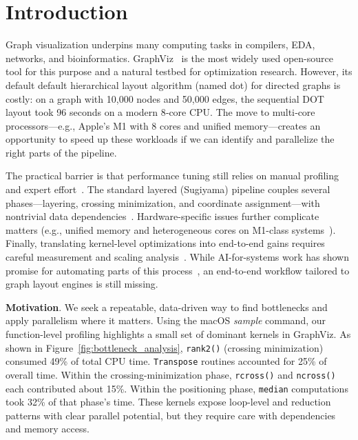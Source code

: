 \section{Introduction}

Graph visualization underpins many computing tasks in compilers, EDA, networks, and bioinformatics. GraphViz~\cite{gansner1993technique,ellson2001graphviz} is the most widely used open-source tool for this purpose and a natural testbed for optimization research. However, its default default hierarchical layout algorithm (named dot) for directed graphs is costly: on a graph with 10,000 nodes and 50,000 edges, the sequential DOT layout took 96 seconds on a modern 8‑core CPU. The move to multi‑core processors—e.g., Apple’s M1 with 8 cores and unified memory—creates an opportunity to speed up these workloads if we can identify and parallelize the right parts of the pipeline.

The practical barrier is that performance tuning still relies on manual profiling and expert effort~\cite{stephenson2003meta}. The standard layered (Sugiyama) pipeline couples several phases—layering, crossing minimization, and coordinate assignment—with nontrivial data dependencies~\cite{sugiyama1981methods,eiglsperger2005efficient}. Hardware-specific issues further complicate matters (e.g., unified memory and heterogeneous cores on M1-class systems~\cite{winarta2024analyzing}). Finally, translating kernel-level optimizations into end-to-end gains requires careful measurement and scaling analysis~\cite{dongarra2011international,amdahl1967validity,gustafson1988reevaluating}. While AI-for-systems work has shown promise for automating parts of this process~\cite{ashouri2018survey,cummins2017end}, an end-to-end workflow tailored to graph layout engines is still missing.


\textbf{Motivation}. We seek a repeatable, data-driven way to find bottlenecks and apply parallelism where it matters. Using the macOS \textit{sample} command, 
our function-level profiling highlights a small set of dominant kernels in GraphViz. As shown in Figure~\ref{fig:bottleneck_analysis}, \texttt{rank2()} (crossing minimization) consumed 49\% of total CPU time. \texttt{Transpose} routines accounted for 25\% of overall time. Within the crossing-minimization phase, \texttt{rcross()} and \texttt{ncross()} each contributed about 15\%. Within the positioning phase, \texttt{median} computations took 32\% of that phase’s time. These kernels expose loop-level and reduction patterns with clear parallel potential, but they require care with dependencies and memory access.

